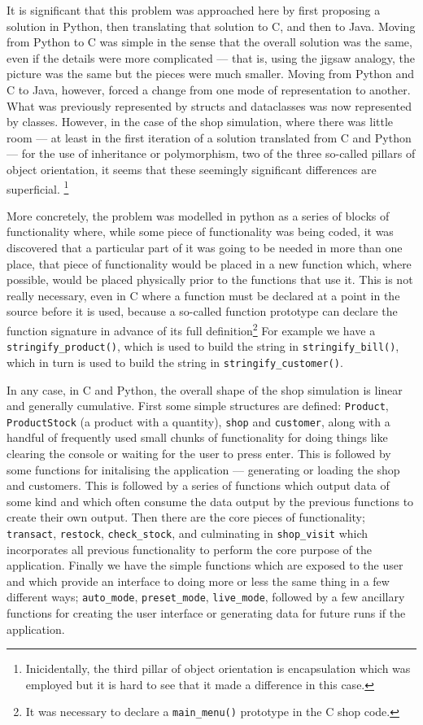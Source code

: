 \documentclass[12pt, a4paper]{article}
\begin{document}
It is significant that this problem was approached here by first proposing a solution in Python, then translating that solution to C, and then to Java. Moving from Python to C was simple in the sense that the overall solution was the same, even if the details were more complicated --- that is, using the jigsaw analogy, the picture was the same but the pieces were much smaller. Moving from Python and C to Java, however, forced a change from one mode of representation to another. What was previously represented by structs and dataclasses was now represented by classes. However, in the case of the shop simulation, where there was little room --- at least in the first iteration of a solution translated from C and Python --- for the use of inheritance or polymorphism, two of the three so-called pillars of object orientation, it seems that these seemingly significant differences are superficial. \footnote{Inicidentally, the third pillar of object orientation is encapsulation which was employed but it is hard to see that it made a difference in this case.}

More concretely, the problem was modelled in python as a series of blocks of functionality where, while some piece of functionality was being coded, it was discovered that a particular part of it was going to be needed in more than one place, that piece of functionality would be placed in a new function which, where possible, would be placed physically prior to the functions that use it. This is not really necessary, even in C where a function must be declared at a point in the source before it is used, because a so-called function prototype can declare the function signature in advance of its full definition\footnote{It was necessary to declare a \texttt{main\_menu()} prototype in the C shop code.} For example we have a \texttt{stringify\_product()}, which is used to build the string in \texttt{stringify\_bill()}, which in turn is used to build the string in \texttt{stringify\_customer()}.

In any case, in C and Python, the overall shape of the shop simulation is linear and generally cumulative. First some simple structures are defined: \texttt{Product}, \texttt{ProductStock} (a product with a quantity), \texttt{shop} and \texttt{customer}, along with a handful of frequently used small chunks of functionality for doing things like clearing the console or waiting for the user to press enter. This is followed by some functions for initalising the application --- generating or loading the shop and customers. This is followed by a series of functions which output data of some kind and which often consume the data output by the previous functions to create their own output. Then there are the core pieces of functionality; \texttt{transact}, \texttt{restock}, \texttt{check\_stock}, and culminating in \texttt{shop\_visit} which incorporates all previous functionality to perform the core purpose of the application. Finally we have the simple functions which are exposed to the user and which provide an interface to doing more or less the same thing in a few different ways; \texttt{auto\_mode}, \texttt{preset\_mode}, \texttt{live\_mode}, followed by a few ancillary functions for creating the user interface or generating data for future runs if the application.
\end{document}
